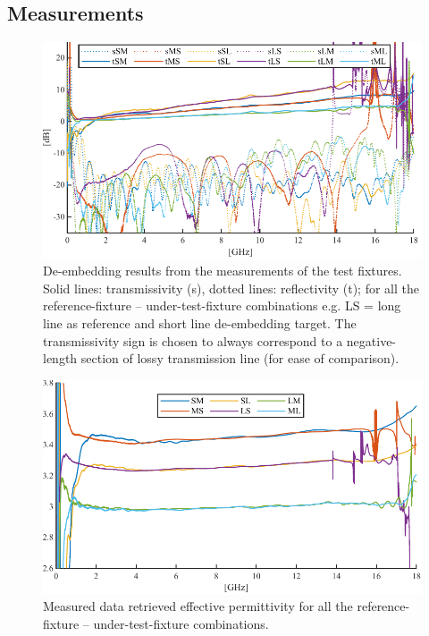\documentclass[11pt,a4paper]{article}
\begin{document}
    \subsection{Measurements}
    \label{subsec:measurements}
    \begin{figure}[!tb]
        \includegraphics[width=\textwidth]{sparameas}
        \caption{De-embedding results from the measurements of the test fixtures.
        Solid lines: transmissivity (s), dotted lines: reflectivity (t);
        for all the reference-fixture -- under-test-fixture combinations e.g. LS = long line as reference and short line de-embedding target.
        The transmissivity sign is chosen to always correspond to a negative-length section
        of lossy transmission line (for ease of comparison).}
        \label{fig:sparameas}
    \end{figure}
    \begin{figure}[!tb]
        \includegraphics[width=\textwidth]{epsimeas}
        \caption{Measured data retrieved effective permittivity for all the reference-fixture -- under-test-fixture combinations.}
        \label{fig:epsilonmeas}
    \end{figure}
\end{document}
